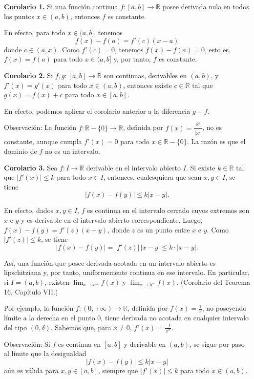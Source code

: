 \documentclass[12pt,oneside]{book}
\begin{document}
\textbf{Corolario 1.} Si una función continua \( f: [a, b] \to \mathbb{R} \) posee derivada nula en todos los puntos \( x \in (a, b) \), entonces \( f \) es constante.

En efecto, para todo \( x \in (a, b] \), tenemos
\[
f(x) - f(a) = f'(c)(x - a)
\]
donde \( c \in (a, x) \). Como \( f'(c) = 0 \), tenemos \( f(x) - f(a) = 0 \), esto es, \( f(x) = f(a) \) para todo \( x \in (a, b] \) y, por tanto, \( f \) es constante.

\textbf{Corolario 2.} Si \( f, g: [a, b] \to \mathbb{R} \) son continuas, derivables en \( (a, b) \), y \( f'(x) = g'(x) \) para todo \( x \in (a, b) \), entonces existe \( c \in \mathbb{R} \) tal que \( g(x) = f(x) + c \) para todo \( x \in [a, b] \).

En efecto, podemos aplicar el corolario anterior a la diferencia \( g - f \).

Observación: La función \( f: \mathbb{R} - \{0\} \to \mathbb{R} \), definida por \( f(x) = \dfrac{x}{|x|} \), no es constante, aunque cumpla \( f'(x) = 0 \) para todo \( x \in \mathbb{R} - \{0\} \). La razón es que el dominio de \( f \) no es un intervalo.

\textbf{Corolario 3.} Sea \( f: I \to \mathbb{R} \) derivable en el intervalo abierto \( I \). Si existe \( k \in \mathbb{R} \) tal que \( |f'(x)| \leq k \) para todo \( x \in I \), entonces, cualesquiera que sean \( x, y \in I \), se tiene
\[
|f(x) - f(y)| \leq k|x - y|.
\]

En efecto, dados \( x, y \in I \), \( f \) es continua en el intervalo cerrado cuyos extremos son \( x \) e \( y \) y es derivable en el intervalo abierto correspondiente. Luego, \( f(x) - f(y) = f'(z)(x - y) \), donde \( z \) es un punto entre \( x \) e \( y \). Como \( |f'(z)| \leq k \), se tiene
\[
|f(x) - f(y)| = |f'(z)|\,|x - y| \leq k \cdot |x - y|.
\]

Así, una función que posee derivada acotada en un intervalo abierto es lipschitziana y, por tanto, uniformemente continua en ese intervalo. En particular, si \( I = (a, b) \), existen \( \lim_{x \to a^+} f(x) \) y \( \lim_{x \to b^-} f(x) \). (Corolario del Teorema 16, Capítulo VII.)

Por ejemplo, la función \( f: (0, +\infty) \to \mathbb{R} \), definida por \( f(x) = \frac{1}{x} \), no poseyendo límite a la derecha en el punto \( 0 \), tiene derivada no acotada en cualquier intervalo del tipo \( (0, \delta) \). Sabemos que, para \( x \neq 0 \), \( f'(x) = \frac{-1}{x^2} \).

Observación: Si \( f \) es continua en \( [a, b] \) y derivable en \( (a, b) \), se sigue por paso al límite que la desigualdad
\[
|f(x) - f(y)| \leq k|x - y|
\]
aún es válida para \( x, y \in [a, b] \), siempre que \( |f'(x)| \leq k \) para todo \( x \in (a, b) \).
\end{document}
